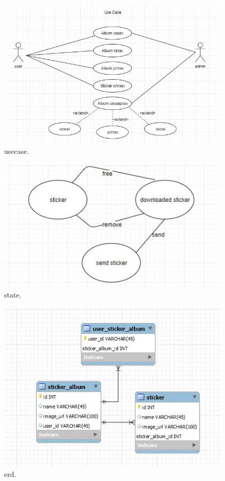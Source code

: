 \documentclass[12pt]{article}
\begin{document}
		\begin{figure}
		\includegraphics[width=\linewidth]{usecase.jpg}
		\caption{usecase.}
		\label{fig:usecase}
		\end{figure}
		\begin{figure}
		\includegraphics[width=\linewidth]{state.jpg}
		\caption{state.}
		\label{fig:usecase}
	\end{figure}
		\begin{figure}
		\includegraphics[width=\linewidth]{erd.jpg}
		\caption{erd.}
		\label{fig:erd}
	\end{figure}
\end{document}
